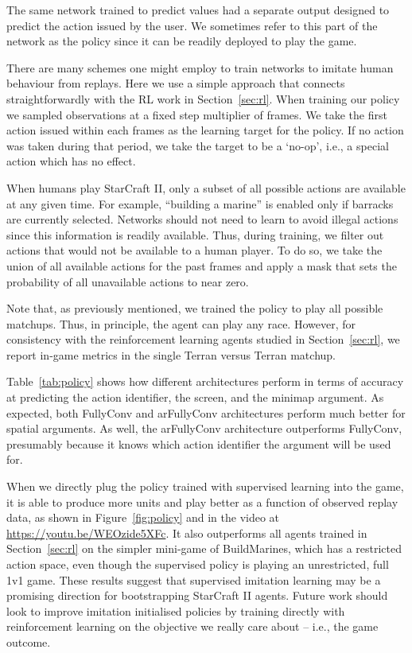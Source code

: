 \documentclass{article}
\begin{document}
The same network trained to predict values had a separate output designed to predict the action issued by the user. We sometimes refer to this part of the network as the policy since it can be readily deployed to play the game. 

There are many schemes one might employ to train networks to imitate human behaviour from replays.  Here we use a simple approach that connects straightforwardly with the RL work in Section~\ref{sec:rl}. When training our policy we sampled observations at a fixed step multiplier of  frames.  
We take the first action issued within each  frames as the learning target for the policy.
If no action was taken during that period, we take the target to be a `no-op', i.e., a special action which has no effect. 

When humans play StarCraft II, only a subset of all possible actions are available at any given time. For example, ``building a marine'' is enabled only if barracks are currently selected. Networks should not need to learn to avoid illegal actions since this information is readily available.  Thus, during training, we filter out actions that would not be available to a human player. To do so, we take the union of all available actions for the past  frames and apply a mask that sets the probability of all unavailable actions to near zero.

Note that, as previously mentioned, we trained the policy to play all possible matchups. Thus, in principle, the agent can play any race. However, for consistency with the reinforcement learning agents studied in Section~\ref{sec:rl}, we report in-game metrics in the single Terran versus Terran matchup.

Table~\ref{tab:policy} shows how different architectures perform in terms of accuracy at predicting the action identifier, the screen, and the minimap argument. As expected, both FullyConv and arFullyConv architectures perform much better for spatial arguments.  As well, the arFullyConv architecture outperforms FullyConv, presumably because it knows which action identifier the argument will be used for.

When we directly plug the policy trained with supervised learning into the game, it is able to produce more units and play better as a function of observed replay data, as shown in Figure~\ref{fig:policy} and in the video at \url{https://youtu.be/WEOzide5XFc}. It also outperforms all agents trained in Section~\ref{sec:rl} on the simpler  mini-game of BuildMarines, which has a restricted action space, even though the supervised policy is playing an unrestricted, full 1v1 game. These results suggest that supervised imitation learning may be a promising direction for bootstrapping StarCraft II agents. Future work should look to improve imitation initialised policies by training directly with reinforcement learning on the objective we really care about -- i.e., the game outcome.
\end{document}
